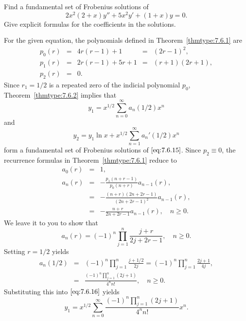\documentclass{ximera}
\begin{document}
\begin{example}\label{example:7.6.2}
Find a fundamental set of Frobenius  solutions of
\begin{equation} \label{eq:7.6.15}
2x^2(2+x)y''+5x^2y'+(1+x)y=0.
\end{equation}
Give explicit formulas for the coefficients in the solutions.

\begin{explanation}
For  the given equation, the polynomials defined in
Theorem~\ref{thmtype:7.6.1} are
$$
\begin{array}{cclcl}
p_0(r)&=&4r(r-1)+1&=&(2r-1)^2,\\
p_1(r)&=&2r(r-1)+5r+1&=&(r+1)(2r+1),\\
p_2(r)&=&0.
\end{array}
$$
Since $r_1=1/2$ is a repeated zero of the  indicial polynomial $p_0$,
Theorem~\ref{thmtype:7.6.2} implies that
\begin{equation} \label{eq:7.6.16}
y_1=x^{1/2}\sum_{n=0}^\infty  a_n(1/2)x^n
\end{equation}
and
\begin{equation} \label{eq:7.6.17}
y_2=y_1\ln x+x^{1/2}\sum_{n=1}^\infty a_n'(1/2)x^n
\end{equation}
form a fundamental set of Frobenius solutions of $\eqref{eq:7.6.15}$.
Since $p_2\equiv0$, the recurrence formulas in Theorem~\ref{thmtype:7.6.1}
 reduce to
$$
\begin{array}{ccl}
a_0(r)&=&1,\\
a_n(r)&=&-\frac{p_1(n+r-1)}{p_0(n+r)}a_{n-1}(r),\\
&=&-\frac{(n+r)(2n+2r-1)}{(2n+2r-1)^2}a_{n-1}(r),\\
&=&-\frac{n+r}{2n+2r-1}a_{n-1}(r),\quad n\geq 0.
\end{array}
$$
We leave it to you to show that
\begin{equation} \label{eq:7.6.18}
a_n(r)=(-1)^n\prod_{j=1}^n\frac{j+r}{2j+2r-1},\quad n\geq 0.
\end{equation}
Setting $r=1/2$  yields
\begin{equation} \label{eq:7.6.19}
\begin{array}{ccl}
a_n(1/2)&=&(-1)^n\prod_{j=1}^n\frac{j+1/2}{2j}=
(-1)^n\prod_{j=1}^n\frac{2j+1}{4j},\\
&=&\frac{(-1)^n\prod_{j=1}^n(2j+1)}{4^nn!},\quad n\geq 0.
\end{array}
\end{equation}
Substituting this into $\eqref{eq:7.6.16}$ yields
$$
y_1=x^{1/2}\sum_{n=0}^\infty\frac{(-1)^n\prod_{j=1}^n(2j+1)}{4^nn!}x^n.
$$


\end{explanation}
\end{example}
\end{document}
